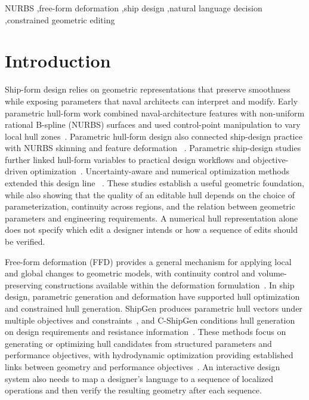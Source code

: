 \documentclass[a4paper,fleqn]{cas-dc}
\begin{document}
\begin{keywords}
NURBS \sep free-form deformation \sep ship design \sep natural language decision \sep constrained geometric editing
\end{keywords}

\maketitle

\section{Introduction}
\label{sec:introduction}

Ship-form design relies on geometric representations that preserve smoothness
while exposing parameters that naval architects can interpret and modify. Early
parametric hull-form work combined naval-architecture features with non-uniform
rational B-spline (NURBS) surfaces and used control-point manipulation to vary
local hull zones~\citep{nam2000parametric}. Parametric hull-form design also
connected ship-design practice with NURBS skinning and feature deformation
~\citep{abt2001parametric,shamsuddin2006skinning,zhou2022nurbs}.
Parametric ship-design studies further linked hull-form variables to practical
design workflows and objective-driven optimization~\citep{wilson2010hull,peri2001cfd}.
Uncertainty-aware and numerical optimization methods extended this design line
~\citep{campana2009optimization,diez2012uncertainty}.
These studies establish a useful geometric foundation, while also showing that
the quality of an editable hull depends on the choice of parameterization,
continuity across regions, and the relation between geometric parameters and
engineering requirements. A numerical hull representation alone does not specify
which edit a designer intends or how a sequence of edits should be verified.

Free-form deformation (FFD) provides a general mechanism for applying local and
global changes to geometric models, with continuity control and volume-preserving
constructions available within the deformation formulation~\citep{sederberg1986ffd}.
In ship design, parametric generation and deformation have supported hull
optimization and constrained hull generation. ShipGen produces parametric hull
vectors under multiple objectives and constraints~\citep{bagazinski2023shipgen},
and C-ShipGen conditions hull generation on design requirements and resistance
information~\citep{bagazinski2024cshipgen}. These methods focus on generating or
optimizing hull candidates from structured parameters and performance objectives,
with hydrodynamic optimization providing established links between geometry and
performance objectives~\citep{peri2001cfd,campana2009optimization}.
An interactive design system also needs to map a designer's language to a
sequence of localized operations and then verify the resulting geometry after
each sequence.
\end{document}
